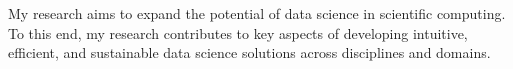 \documentclass[11pt, a4paper]{andre-bewerbung}
\begin{document}


\makecvheader[C]
\makecvfooter{}

\vspace{0.5cm}


\begin{cvtext}
    My research aims to expand the potential of data science in scientific computing. To this end, my research contributes to key aspects of developing intuitive, efficient, and sustainable data science solutions across disciplines and domains.
\end{cvtext}


















\end{document}
